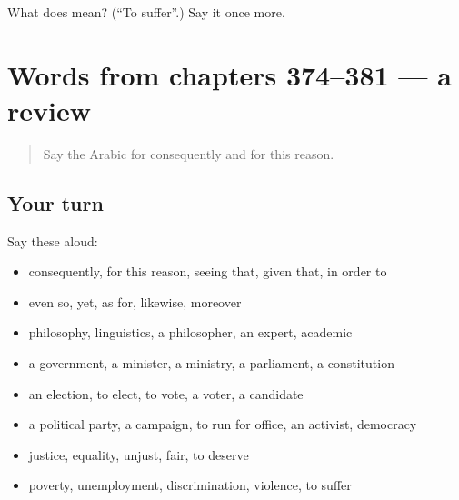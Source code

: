 \begin{tcolorbox}[breakable,colback=teal!4,colframe=teal!35!black,title={Before you move on}]
What does  mean? (\textquotedblleft{}To suffer\textquotedblright{}.) Say it once more.
\end{tcolorbox}
\section[(dialogue)]{Words from chapters 374–381 — a review}

\label{lesson:AR-R381-review-374-381}



\begin{quote}
Say the Arabic for consequently and for this reason.
\end{quote}

\subsection*{Your turn}
Say these aloud:

\begin{itemize}
\raggedright
  \item consequently, for this reason, seeing that, given that, in order to
  \item even so, yet, as for, likewise, moreover
  \item philosophy, linguistics, a philosopher, an expert, academic
  \item a government, a minister, a ministry, a parliament, a constitution
  \item an election, to elect, to vote, a voter, a candidate
  \item a political party, a campaign, to run for office, an activist, democracy
  \item justice, equality, unjust, fair, to deserve
  \item poverty, unemployment, discrimination, violence, to suffer
\end{itemize}


